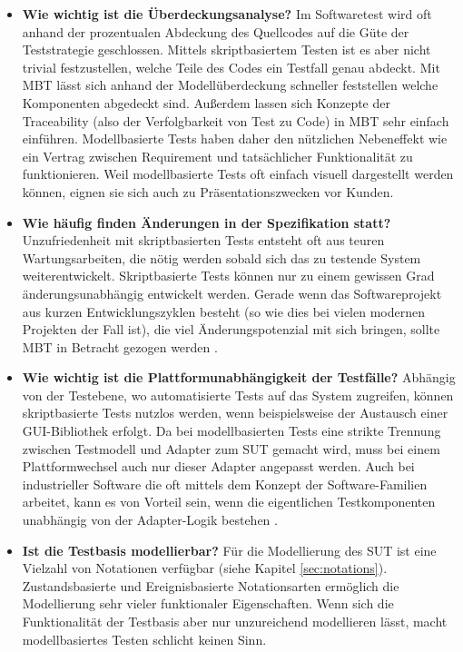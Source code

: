 \begin{itemize}
\item \textbf{Wie wichtig ist die Überdeckungsanalyse?}
Im Softwaretest wird oft anhand der prozentualen Abdeckung des Quellcodes auf die Güte der Teststrategie geschlossen. Mittels skriptbasiertem Testen ist es aber nicht trivial festzustellen, welche Teile des Codes ein Testfall genau abdeckt. Mit \Gls{MBT} lässt sich anhand der Modellüberdeckung schneller feststellen welche Komponenten abgedeckt sind. Außerdem lassen sich Konzepte der Traceability (also der Verfolgbarkeit von Test zu Code) in \Gls{MBT} sehr einfach einführen. Modellbasierte Tests haben daher den nützlichen Nebeneffekt wie ein Vertrag zwischen Requirement und tatsächlicher Funktionalität zu funktionieren. Weil modellbasierte Tests oft einfach visuell dargestellt werden können, eignen sie sich auch zu Präsentationszwecken vor Kunden.
\item \textbf{Wie häufig finden Änderungen in der Spezifikation statt?} 
Unzufriedenheit mit skriptbasierten Tests entsteht oft aus teuren Wartungsarbeiten, die nötig werden sobald sich das zu testende System weiterentwickelt. Skriptbasierte Tests können nur zu einem gewissen Grad änderungsunabhängig entwickelt werden. Gerade wenn das Softwareprojekt aus kurzen Entwicklungszyklen besteht (so wie dies bei vielen modernen Projekten der Fall ist), die viel Änderungspotenzial mit sich bringen, sollte \Gls{MBT} in Betracht gezogen werden \cite{utting_practical_2007}.
\item \textbf{Wie wichtig ist die Plattformunabhängigkeit der Testfälle?}
Abhängig von der Testebene, wo automatisierte Tests auf das System zugreifen, können skriptbasierte Tests nutzlos werden, wenn beispielsweise der Austausch einer GUI-Bibliothek erfolgt. Da bei modellbasierten Tests eine strikte Trennung zwischen Testmodell und Adapter zum \Gls{SUT} gemacht wird, muss bei einem Plattformwechsel auch nur dieser Adapter angepasst werden. Auch bei industrieller Software die oft mittels dem Konzept der Software-Familien arbeitet, kann es von Vorteil sein, wenn die eigentlichen Testkomponenten unabhängig von der Adapter-Logik bestehen \cite{graham_experiences_2012}.
	\item \textbf{Ist die Testbasis modellierbar?}
Für die Modellierung des \Gls{SUT} ist eine Vielzahl von Notationen verfügbar (siehe Kapitel \ref{sec:notations}). Zustandsbasierte und Ereignisbasierte Notationsarten ermöglich die Modellierung sehr vieler funktionaler Eigenschaften. Wenn sich die Funktionalität der Testbasis aber nur unzureichend modellieren lässt, macht modellbasiertes Testen schlicht keinen Sinn.

\end{itemize}
